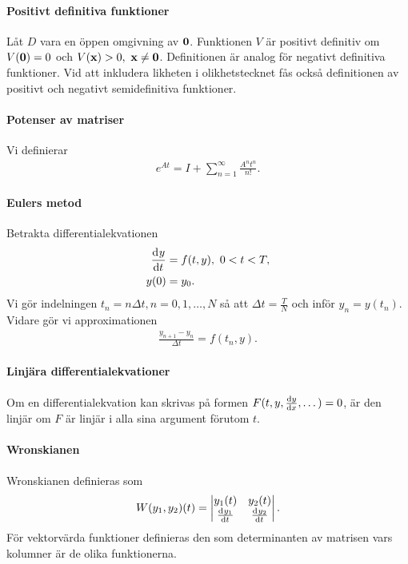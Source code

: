 \paragraph{Positivt definitiva funktioner}
Låt $D$ vara en öppen omgivning av $\vb{0}$. Funktionen $V$ är positivt definitiv om $V(\vb{0}) = 0$ och $V(\vb{x}) > 0,\ \vb{x}\neq\vb{0}$. Definitionen är analog för negativt definitiva funktioner. Vid att inkludera likheten i olikhetstecknet fås också definitionen av positivt och negativt semidefinitiva funktioner.

\paragraph{Potenser av matriser}
Vi definierar
\begin{align*}
	e^{At} = I + \sum\limits_{n = 1}^{\infty}\frac{A^{n}t^{n}}{n!}.
\end{align*}

\paragraph{Eulers metod}
Betrakta differentialekvationen
\begin{align*}
	\dv[]{y}{t} (t) &= f(t, y),\ 0 < t < T, \\
	y(0)             &= y_0.
\end{align*}
Vi gör indelningen $t_n = n\Delta t, n = 0, 1, \dots, N$ så att $\Delta t = \frac{T}{N}$ och inför $y_n = y(t_n)$. Vidare gör vi approximationen
\begin{align*}
	\frac{y_{n + 1} - y_{n}}{\Delta t} = f(t_n, y).
\end{align*}

\paragraph{Linjära differentialekvationer}
Om en differentialekvation kan skrivas på formen $F(t, y, \dv{y}{x}, \dots) = 0$, är den linjär om $F$ är linjär i alla sina argument förutom $t$.

\paragraph{Wronskianen}
Wronskianen definieras som
\begin{align*}
	W(y_1, y_2)(t) = \mdet{y_{1}(t) & y_{2}(t) \\ \deval{y_{1}}{t}{t} & \deval{y_{2}}{t}{t}}.
\end{align*}
För vektorvärda funktioner definieras den som determinanten av matrisen vars kolumner är de olika funktionerna.

